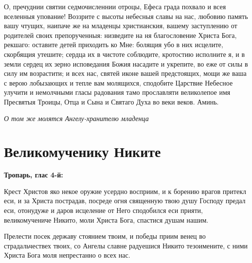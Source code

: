 

О, пречуднии святии седмочисленнии отроцы, Ефеса града похвало и всея вселенныя упование! Воззрите с высоты небесныя славы на нас, любовию память вашу чтущих, наипаче же на младенцы христианския, вашему заступлению от родителей своих препорученныя: низведите на ня благословение Христа Бога, рекшаго: оставите детей приходить ко Мне: болящия убо в них исцелите, скорбящия утешите; сердца их в чистоте соблюдите, кротостию исполните я, и в земли сердец их зерно исповедания Божия насадите и укрепите, во еже от силы в силу им возрастити; и всех нас, святей иконе вашей предстоящих, мощи же ваша с верою лобызающих и тепле вам молящихся, сподобите Царствие Небесное улучити и немолчными гласы радования тамо прославляти великолепое имя Пресвятыя Троицы, Отца и Сына и Святаго Духа во веки веков. Аминь.

\itshape О том же молятся Ангелу-хранителю младенца\normalfont{} 

\mychapterending


 

\section{Великомученику Никите}
 
\bfseries Тропарь, глас 4-й:\normalfont{}


Крест Христов яко некое оружие усердно восприим, и к борению врагов притекл еси, и за Христа пострадав, посреде огня священную твою душу Господу предал еси, отонудуже и даров исцеление от Него сподобился еси прияти, великомучениче Никито, моли Христа Бога, спастися душам нашим.



Прелести посек державу стоянием твоим, и победы приим венец во страдальчествех твоих, со Ангелы славне радуешися Никито тезоимените, с ними Христа Бога моля непрестанно о всех нас.




